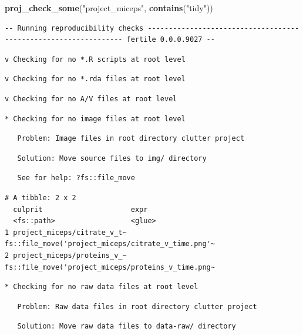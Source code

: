 \documentclass[12pt,twoside]{reedthesis}
\newenvironment{Shaded}{\begin{snugshade}}{\end{snugshade}}
\newcommand{\KeywordTok}[1]{\textcolor[rgb]{0.13,0.29,0.53}{\textbf{#1}}}
\newcommand{\StringTok}[1]{\textcolor[rgb]{0.31,0.60,0.02}{#1}}
\newcommand{\NormalTok}[1]{#1}
\begin{document}
\footnotesize
\begin{Shaded}
\begin{Highlighting}[]
\KeywordTok{proj_check_some}\NormalTok{(}\StringTok{"project_miceps"}\NormalTok{, }\KeywordTok{contains}\NormalTok{(}\StringTok{"tidy"}\NormalTok{))}
\end{Highlighting}
\end{Shaded}
\begin{verbatim}
-- Running reproducibility checks ---------------------------------------------------------------- fertile 0.0.0.9027 --
\end{verbatim}
\begin{verbatim}
v Checking for no *.R scripts at root level
\end{verbatim}
\begin{verbatim}
v Checking for no *.rda files at root level
\end{verbatim}
\begin{verbatim}
v Checking for no A/V files at root level
\end{verbatim}
\begin{verbatim}
* Checking for no image files at root level
\end{verbatim}
\begin{verbatim}
   Problem: Image files in root directory clutter project
\end{verbatim}
\begin{verbatim}
   Solution: Move source files to img/ directory
\end{verbatim}
\begin{verbatim}
   See for help: ?fs::file_move
\end{verbatim}
\begin{verbatim}
# A tibble: 2 x 2
  culprit                     expr                                              
  <fs::path>                  <glue>                                            
1 project_miceps/citrate_v_t~ fs::file_move('project_miceps/citrate_v_time.png'~
2 project_miceps/proteins_v_~ fs::file_move('project_miceps/proteins_v_time.png~
\end{verbatim}
\begin{verbatim}
* Checking for no raw data files at root level
\end{verbatim}
\begin{verbatim}
   Problem: Raw data files in root directory clutter project
\end{verbatim}
\begin{verbatim}
   Solution: Move raw data files to data-raw/ directory
\end{verbatim}
\end{document}
